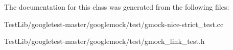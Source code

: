 The documentation for this class was generated from the following files\+:\begin{DoxyCompactItemize}
\item 
Test\+Lib/googletest-\/master/googlemock/test/gmock-\/nice-\/strict\+\_\+test.\+cc\item 
Test\+Lib/googletest-\/master/googlemock/test/gmock\+\_\+link\+\_\+test.\+h\end{DoxyCompactItemize}
